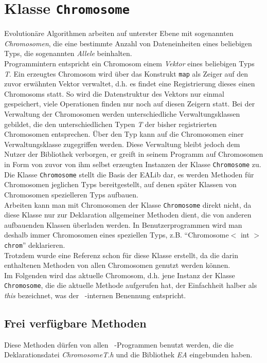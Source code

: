 \documentclass{report}
\begin{document}
\chapter{Klasse {\tt Chromosome}}
Evolution\"are Algorithmen arbeiten auf unterster Ebene mit sogenannten
{\em Chromosomen}, die eine bestimmte Anzahl von Dateneinheiten eines
beliebigen Typs, die sogenannten {\em Allele} beinhalten.\\
Programmintern entspricht ein Chromosom einem {\em Vektor} eines beliebigen 
Typs {\em T}.
Ein erzeugtes Chromosom wird \"uber das Konstrukt {\tt map} als
Zeiger auf den zuvor erw\"ahnten Vektor verwaltet, d.h. es findet eine
Registrierung dieses einen Chromosoms statt. So wird die Datenstruktur
des Vektors nur einmal gespeichert, viele Operationen finden nur noch
auf diesen Zeigern statt. Bei der Verwaltung der Chromosomen werden
unterschiedliche Verwaltungsklassen gebildet, die den unterschiedlichen
Typen {\sl T} der bisher registrierten Chromosomen entsprechen.
\"Uber den Typ kann auf die Chromosomen einer Verwaltungsklasse zugegriffen
werden. Diese Verwaltung bleibt jedoch dem Nutzer der Bibliothek verborgen,
er greift in seinem Programm auf Chromosomen in Form von zuvor von ihm 
selbst erzeugten Instanzen der Klasse {\tt Chromosome} zu.\\
Die Klasse {\tt Chromosome} stellt die Basis der EALib dar, es werden 
Methoden f\"ur Chromosomen jeglichen Typs bereitgestellt, auf denen sp\"ater
Klassen von Chromosomen spezielleren Typs aufbauen.\\
Arbeiten kann man mit Chromosomen der Klasse {\tt Chromosome} direkt nicht,
da diese Klasse nur zur Deklaration allgemeiner Methoden dient, die von 
anderen aufbauenden Klassen \"uberladen werden. 
In Benutzerprogrammen wird man deshalb immer
Chromosomen eines speziellen Typs, z.B. ``Chromosome$<$ int $>$ {\tt chrom}''
deklarieren.\\
Trotzdem wurde eine Referenz schon f\"ur diese Klasse erstellt, da die
darin enthaltenen Methoden von allen Chromosomen genutzt werden k\"onnen.\\
Im Folgenden wird das aktuelle Chromosom, d.h. jene Instanz der Klasse
{\tt Chro\-mo\-so\-me}, die die aktuelle Methode aufgerufen hat, der Einfachheit 
halber als {\em this} bezeichnet, was der \cpp\ -internen Benennung
entspricht.

\newpage
\section{Frei verf\"ugbare Methoden}
Diese Methoden d\"urfen von allen \cpp\ -Programmen benutzt werden, die
die Deklarationsdatei {\em ChromosomeT.h} und
die Bibliothek {\em EA} eingebunden haben.
\end{document}
